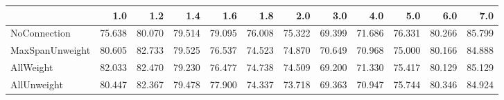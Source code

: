 \begin{tabular}{lrrrrrrrrrrr}
\toprule
{} &    1.0 &    1.2 &    1.4 &    1.6 &    1.8 &    2.0 &    3.0 &    4.0 &    5.0 &    6.0 &    7.0 \\
\midrule
NoConnection    & 75.638 & 80.070 & 79.514 & 79.095 & 76.008 & 75.322 & 69.399 & 71.686 & 76.331 & 80.266 & 85.799 \\
MaxSpanUnweight & 80.605 & 82.733 & 79.525 & 76.537 & 74.523 & 74.870 & 70.649 & 70.968 & 75.000 & 80.166 & 84.888 \\
AllWeight       & 82.033 & 82.470 & 79.230 & 76.477 & 74.738 & 74.509 & 69.200 & 71.330 & 75.417 & 80.129 & 85.129 \\
AllUnweight     & 80.447 & 82.367 & 79.478 & 77.900 & 74.337 & 73.718 & 69.363 & 70.947 & 75.744 & 80.346 & 84.924 \\
\bottomrule
\end{tabular}
